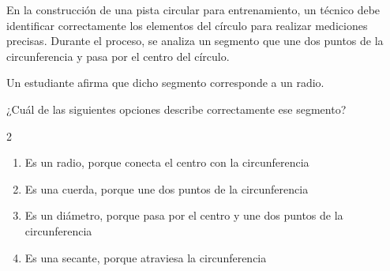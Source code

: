 En la construcción de una pista circular para entrenamiento, un técnico debe identificar correctamente los elementos del círculo para realizar mediciones precisas. Durante el proceso, se analiza un segmento que une dos puntos de la circunferencia y pasa por el centro del círculo.

Un estudiante afirma que dicho segmento corresponde a un radio.

¿Cuál de las siguientes opciones describe correctamente ese segmento?

\begin{multicols}{2}
\begin{enumerate}[label=\alph*), leftmargin=*]
\item Es un radio, porque conecta el centro con la circunferencia
\item Es una cuerda, porque une dos puntos de la circunferencia
\item Es un diámetro, porque pasa por el centro y une dos puntos de la circunferencia
\item Es una secante, porque atraviesa la circunferencia
\end{enumerate}
\end{multicols}